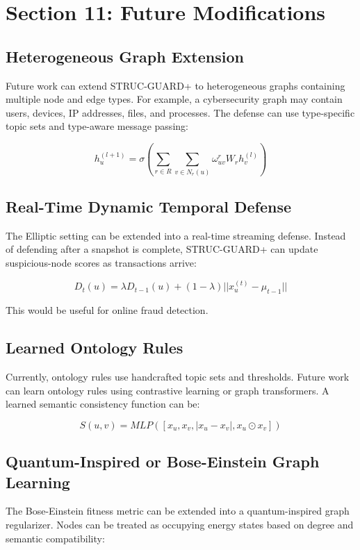 \documentclass[12pt,a4paper]{article}
\begin{document}
\section{Section 11: Future Modifications}

\subsection{Heterogeneous Graph Extension}
Future work can extend STRUC-GUARD+ to heterogeneous graphs containing multiple node and edge types. For example, a cybersecurity graph may contain users, devices, IP addresses, files, and processes. The defense can use type-specific topic sets and type-aware message passing:

$$
h_u^{(l+1)}=\sigma\left(\sum_{r\in R}\sum_{v\in N_r(u)}\omega_{uv}^{r}W_rh_v^{(l)}\right)
$$

\subsection{Real-Time Dynamic Temporal Defense}
The Elliptic setting can be extended into a real-time streaming defense. Instead of defending after a snapshot is complete, STRUC-GUARD+ can update suspicious-node scores as transactions arrive:

$$
D_t(u)=\lambda D_{t-1}(u)+(1-\lambda)||x_u^{(t)}-\mu_{t-1}||
$$

This would be useful for online fraud detection.

\subsection{Learned Ontology Rules}
Currently, ontology rules use handcrafted topic sets and thresholds. Future work can learn ontology rules using contrastive learning or graph transformers. A learned semantic consistency function can be:

$$
S(u,v)=MLP([x_u,x_v,|x_u-x_v|,x_u\odot x_v])
$$

\subsection{Quantum-Inspired or Bose-Einstein Graph Learning}
The Bose-Einstein fitness metric can be extended into a quantum-inspired graph regularizer. Nodes can be treated as occupying energy states based on degree and semantic compatibility:
\end{document}
